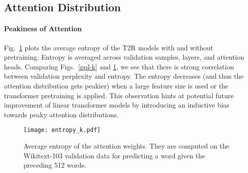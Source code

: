 \documentclass[11pt]{article}
\newcommand{\TRNN}{T2R\xspace}
\begin{document}
\subsection{Attention Distribution}
\paragraph{Peakiness of Attention}
Fig.\ \ref{fig:entropy-kernel} plots the average entropy of the \TRNN models with and without pretraining.
Entropy is averaged across validation samples, layers, and attention heads.
Comparing Figs.\ \ref{ppl-k} and \ref{fig:entropy-kernel}, we see that there is strong correlation between validation perplexity and entropy.
The entropy decreases (and thus the attention distribution gets peakier) when a large feature size is used or the transformer pretraining is applied.
This observation hints at potential future improvement of linear transformer models by introducing an inductive bias towards peaky attention distributions.

\begin{figure}[h]
\centering
    \texttt{[image: entropy\_k.pdf]}
\caption{Average entropy of the attention weights. They are computed on the Wikitext-103 validation data for predicting a word given the preceding 512 words.}
\label{fig:entropy-kernel}
\end{figure}
\end{document}
